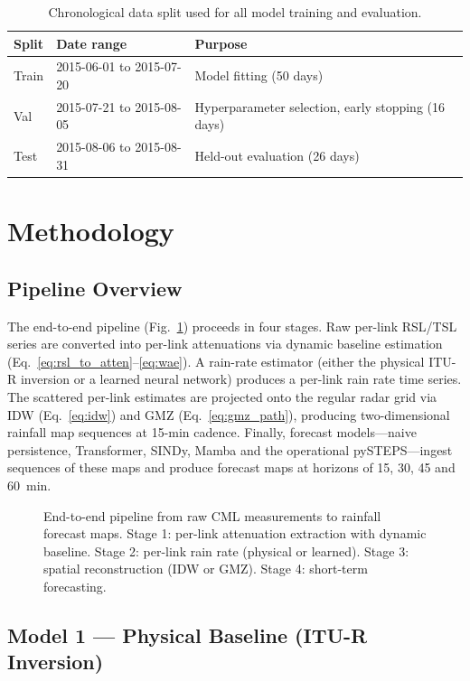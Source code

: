 \documentclass[12pt, a4paper]{article}
\begin{document}
\begin{table}[h]
\centering
\caption{Chronological data split used for all model training and evaluation.}
\label{tab:splits}
\begin{tabular}{lll}
\toprule
Split & Date range & Purpose \\
\midrule
Train & 2015-06-01 to 2015-07-20 & Model fitting (50 days) \\
Val   & 2015-07-21 to 2015-08-05 & Hyperparameter selection, early stopping (16 days) \\
Test  & 2015-08-06 to 2015-08-31 & Held-out evaluation (26 days) \\
\bottomrule
\end{tabular}
\end{table}

\section{Methodology}\label{sec:methodology}

\subsection{Pipeline Overview}

The end-to-end pipeline (Fig.~\ref{fig:pipeline}) proceeds in four
stages. Raw per-link RSL/TSL series are converted into per-link
attenuations via dynamic baseline estimation
(Eq.~\ref{eq:rsl_to_atten}--\ref{eq:wae}). A rain-rate estimator
(either the physical ITU-R inversion or a learned neural network)
produces a per-link rain rate time series. The scattered per-link
estimates are projected onto the regular radar grid via IDW
(Eq.~\ref{eq:idw}) and GMZ (Eq.~\ref{eq:gmz_path}), producing
two-dimensional rainfall map sequences at 15-min cadence. Finally,
forecast models---naive persistence, Transformer, SINDy, Mamba and the
operational pySTEPS---ingest sequences of these maps and produce
forecast maps at horizons of 15, 30, 45 and 60~min.

\begin{figure}[h]
\centering
{}
\caption{End-to-end pipeline from raw CML measurements to rainfall
forecast maps. Stage 1: per-link attenuation extraction with dynamic
baseline. Stage 2: per-link rain rate (physical or learned). Stage 3:
spatial reconstruction (IDW or GMZ). Stage 4: short-term forecasting.}
\label{fig:pipeline}
\end{figure}

\subsection{Model 1 --- Physical Baseline (ITU-R Inversion)}\label{sec:model1}
\end{document}
